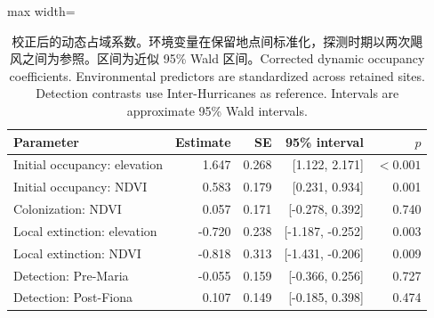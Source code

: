 \begin{table}[htbp]\centering\small
\caption{\ifzh 校正后的动态占域系数。环境变量在保留地点间标准化，探测时期以两次飓风之间为参照。区间为近似 95\% Wald 区间。\else Corrected dynamic occupancy coefficients. Environmental predictors are standardized across retained sites. Detection contrasts use Inter-Hurricanes as reference. Intervals are approximate 95\% Wald intervals.\fi}\label{tab:occintervals}
\begin{adjustbox}{max width=\linewidth}
\begin{tabular}{lrrrr}\toprule
Parameter & Estimate & SE & 95\% interval & $p$ \\
\midrule
Initial occupancy: elevation & 1.647 & 0.268 & [1.122, 2.171] & $<0.001$ \\
Initial occupancy: NDVI & 0.583 & 0.179 & [0.231, 0.934] & 0.001 \\
Colonization: NDVI & 0.057 & 0.171 & [-0.278, 0.392] & 0.740 \\
Local extinction: elevation & -0.720 & 0.238 & [-1.187, -0.252] & 0.003 \\
Local extinction: NDVI & -0.818 & 0.313 & [-1.431, -0.206] & 0.009 \\
Detection: Pre-Maria & -0.055 & 0.159 & [-0.366, 0.256] & 0.727 \\
Detection: Post-Fiona & 0.107 & 0.149 & [-0.185, 0.398] & 0.474 \\
\bottomrule\end{tabular}
\end{adjustbox}
\end{table}
